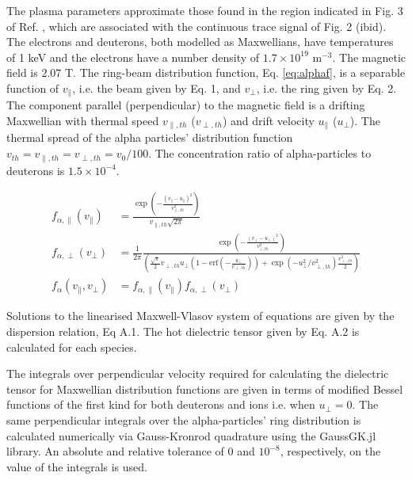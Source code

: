\documentclass[12pt]{iopart}
\begin{document}
The plasma parameters approximate those found in the region indicated in Fig. 3 of Ref. \cite{Cottrell1993}, which are associated with the continuous trace signal of Fig. 2 (ibid). The electrons and deuterons, both modelled as Maxwellians, have temperatures of 1 keV and the electrons have a number density of $1.7\times 10^{19}$ $\mathrm{m^{-3}}$. The magnetic field is $2.07$ $\mathrm{T}$.
The ring-beam distribution function, Eq. \ref{eq:alphaf}, is a separable function of $v_\parallel$, i.e. the beam given by Eq. 1, and $v_\perp$, i.e. the ring given by Eq. 2. The component parallel (perpendicular) to the magnetic field is a drifting Maxwellian with thermal speed $v_{\parallel, th}$ ($v_{\perp, th}$) and drift velocity $u_\parallel$ ($u_\perp$). The thermal spread of the alpha particles' distribution function $v_{th}=v_{\parallel,th}=v_{\perp,th}=v_0/100$. The concentration ratio of alpha-particles to deuterons is $1.5\times10^{-4}$.

\begin{align}
f_{\alpha,\parallel}\left(v_\parallel\right) &= \frac{\exp\left(-\frac{(v_\parallel - u_\parallel)^2}{v_{\parallel,th}^2}\right)}{v_{\parallel,th} \sqrt{2 \pi}}\\
f_{\alpha,\perp}\left(v_\perp\right) &= \frac{1}{2\pi}\frac{\exp\left(-\frac{\left(v_\bot - u_\bot\right)^2}{v_{\bot,th}^2}\right)}{\left(\frac{\sqrt \pi}{2} v_{\perp, th} u_\bot (1 - \mathrm{erf}(-\frac{u_\bot}{v_{\perp,th}})) + \exp(-u_\bot^2 / v_{\perp, th}^2) \frac{v_{\perp,th}^2}{2}\right)}\\
f_\alpha\left(v_\parallel, v_\perp\right) &= f_{\alpha,\parallel}\left(v_\parallel\right)f_{\alpha,\perp}\left(v_\perp\right)
    \label{eq:alphaf}
\end{align}

Solutions to the linearised Maxwell-Vlasov system of equations are given by the dispersion relation, Eq A.1.
The hot dielectric tensor\cite{Stix} given by Eq. A.2 is calculated for each species.

The integrals over perpendicular velocity required for calculating the dielectric tensor for Maxwellian distribution functions are given in terms of modified Bessel functions of the first kind for both deuterons and ions i.e. when $u_\perp =0$. The same perpendicular integrals over the alpha-particles' ring distribution is calculated numerically via Gauss-Kronrod\cite{Kronrod1965} quadrature using the GaussGK.jl\cite{QuadGK} library. An absolute and relative tolerance of $0$ and $10^{-8}$, respectively, on the value of the integrals is used. 
\end{document}
